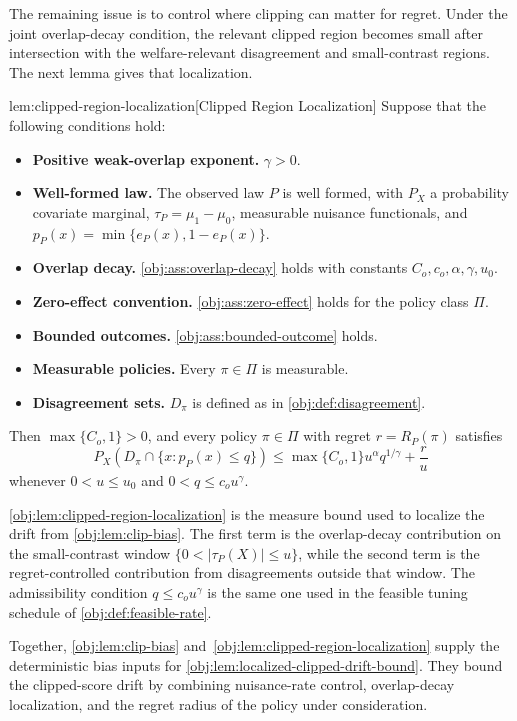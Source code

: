 The remaining issue is to control where clipping can matter for regret.  Under the joint overlap-decay condition, the relevant clipped region becomes small after intersection with the welfare-relevant disagreement and small-contrast regions.  The next lemma gives that localization.

\begin{lemmav}{lem:clipped-region-localization}[Clipped Region Localization]
Suppose that the following conditions hold:
\begin{itemize}
\item \textbf{Positive weak-overlap exponent.} \(\gamma>0\).
\item \textbf{Well-formed law.} The observed law \(P\) is well formed, with \(P_X\) a probability covariate marginal, \(\tau_P=\mu_1-\mu_0\), measurable nuisance functionals, and \(p_P(x)=\min\{e_P(x),1-e_P(x)\}\).
\item \textbf{Overlap decay.} \cref{obj:ass:overlap-decay} holds with constants \(C_o,c_o,\alpha,\gamma,u_0\).
\item \textbf{Zero-effect convention.} \cref{obj:ass:zero-effect} holds for the policy class \(\Pi\).
\item \textbf{Bounded outcomes.} \cref{obj:ass:bounded-outcome} holds.
\item \textbf{Measurable policies.} Every \(\pi\in\Pi\) is measurable.
\item \textbf{Disagreement sets.} \(D_\pi\) is defined as in \cref{obj:def:disagreement}.
\end{itemize}
Then \(\max\{C_o,1\}>0\), and every policy \(\pi\in\Pi\) with regret \(r=R_P(\pi)\) satisfies
\[
P_X\!\left(D_\pi\cap\{x:p_P(x)\le q\}\right)
\le
\max\{C_o,1\} u^\alpha q^{1/\gamma}+\frac{r}{u}
\]
whenever \(0<u\le u_0\) and \(0<q\le c_o u^\gamma\).
\end{lemmav}

\cref{obj:lem:clipped-region-localization} is the measure bound used to localize the drift from \cref{obj:lem:clip-bias}.  The first term is the overlap-decay contribution on the small-contrast window \(\{0<|\tau_P(X)|\le u\}\), while the second term is the regret-controlled contribution from disagreements outside that window.  The admissibility condition \(q\le c_o u^\gamma\) is the same one used in the feasible tuning schedule of \cref{obj:def:feasible-rate}.

Together, \cref{obj:lem:clip-bias} and~\cref{obj:lem:clipped-region-localization} supply the deterministic bias inputs for \cref{obj:lem:localized-clipped-drift-bound}.  They bound the clipped-score drift by combining nuisance-rate control, overlap-decay localization, and the regret radius of the policy under consideration.
